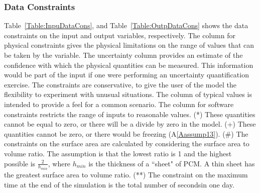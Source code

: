 \documentclass[12pt]{article}
\begin{document}
\subsubsection{Data Constraints}
\label{Sec:DataCons}
Table~\ref{Table:InpuDataCons}, and Table~\ref{Table:OutpDataCons} shows the data constraints on the input and output variables, respectively. The column for physical constraints gives the physical limitations on the range of values that can be taken by the variable. The uncertainty column provides an estimate of the confidence with which the physical quantities can be measured. This information would be part of the input if one were performing an uncertainty quantification exercise. The constraints are conservative, to give the user of the model the flexibility to experiment with unusual situations. The column of typical values is intended to provide a feel for a common scenario. The column for software constraints restricts the range of inputs to reasonable values. (*) These quantities cannot be equal to zero, or there will be a divide by zero in the model. (+) These quantities cannot be zero, or there would be freezing (A\ref{Aassump13}). (#) The constraints on the surface area are calculated by considering the surface area to volume ratio. The assumption is that the lowest ratio is 1 and the highest possible is $\frac{2}{h_{min}}$, where $h_{min}$ is the thickness of a ``sheet" of PCM. A thin sheet has the greatest surface area to volume ratio. (**) The constraint on the maximum time at the end of the simulation is the total number of secondsin one day.
\end{document}
